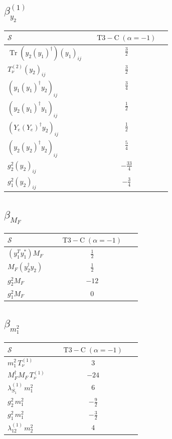 \documentclass[9pt]{article}
\begin{document}
\subsection*{$ \beta_{y_2}^{(1)} $}
\begin{longtable}{@{}p{0.38\linewidth}c@{}}
\toprule
$\mathcal{S}$ & $ \mathrm{T3-C}\;(\alpha=-1) $ \\
\midrule
$ \operatorname{Tr}\!(y_2 (y_1)^{\dagger}) (y_1)_{ij} $ & $ \frac{3}{2} $ \\
$ T_{\nu}^{(2)} (y_2)_{ij} $ & $ \frac{3}{2} $ \\
$ (y_1 (y_1)^{\dagger} y_2)_{ij} $ & $ \frac{3}{4} $ \\
$ (y_2 (y_1)^{\dagger} y_1)_{ij} $ & $ \frac{1}{2} $ \\
$ (Y_e (Y_e)^{\dagger} y_2)_{ij} $ & $ \frac{1}{2} $ \\
$ (y_2 (y_2)^{\dagger} y_2)_{ij} $ & $ \frac{5}{4} $ \\
$ g_2^2 (y_2)_{ij} $ & $ - \frac{33}{4} $ \\
$ g_1^2 (y_2)_{ij} $ & $ - \frac{3}{4} $ \\
\bottomrule
\end{longtable}
\subsection*{$ \beta_{M_F} $}
\begin{longtable}{@{}p{0.31\linewidth}c@{}}
\toprule
$\mathcal{S}$ & $ \mathrm{T3-C}\;(\alpha=-1) $ \\
\midrule
$ (y_1^T y_1^*)M_F $ & $ \frac{1}{2} $ \\
$ M_F(y_2^\dagger y_2) $ & $ \frac{1}{2} $ \\
$ g_2^2M_F $ & $ -12 $ \\
$ g_1^2M_F $ & $ 0 $ \\
\bottomrule
\end{longtable}
\subsection*{$ \beta_{m_1^{2}} $}
\begin{longtable}{@{}p{0.31\linewidth}c@{}}
\toprule
$\mathcal{S}$ & $ \mathrm{T3-C}\;(\alpha=-1) $ \\
\midrule
$ m_1^{2}\,T_{\nu}^{(1)} $ & $ 3 $ \\
$ M_F^\dagger M_F\,T_{\nu}^{(1)} $ & $ -24 $ \\
$ \lambda_{S_1}^{(1)}\,m_1^{2} $ & $ 6 $ \\
$ g_2^2\,m_1^{2} $ & $ - \frac{9}{2} $ \\
$ g_1^2\,m_1^{2} $ & $ - \frac{3}{2} $ \\
$ \lambda_{12}^{(1)}\,m_2^{2} $ & $ 4 $ \\
\bottomrule
\end{longtable}
\end{document}
